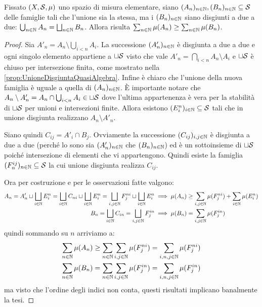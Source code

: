 \begin{lemma}\label{lemma:CoerenzaPremisura}
	Fissato $(X,\S,\mu)$ uno spazio di misura elementare, siano $(A_n)_{n\in\N},(B_n)_{n\in\N}\subseteq\S$ delle famiglie tali che l'unione sia la stessa, ma i $(B_n)_{n\in\N}$ siano disgiunti a due a due: $\bigcup_{n\in\N}A_n=\bigsqcup_{n\in\N}B_n$.
	Allora risulta $\sum_{n\in\N}\mu(A_n)\ge \sum_{n\in\N}\mu(B_n)$.
\end{lemma}
\begin{proof}
	Sia $A'_n=A_n\setminus\bigcup_{i<n}A_i$. La successione $(A'_n)_{n\in\N}$ è disgiunta a due a due e ogni singolo elemento appartiene a $\sqcup \S$ visto che vale $A'_n=\bigcap_{i<n}A_n\setminus A_i$ e $\sqcup \S$ è chiuso per intersezione finita, come mostrato nella \cref{prop:UnioneDisgiuntaQuasiAlgebra}. Infine è chiaro che l'unione della nuova famiglia è uguale a quella di $(A_n)_{n\in\N}$.
	È importante notare che $A_n\setminus A'_n=A_n\cap\bigcup_{i<n}A_i\in\sqcup\S$ dove l'ultima appartenenza è vera per la stabilità di $\sqcup\S$ per unioni e intersezioni finite. Allora esistono $(E^n_i)_{i\in\N}\subseteq\S$ tali che in unione disgiunta realizzano $A_n\setminus A'_n$.
	
	Siano quindi $C_{ij}=A'_i\cap B_j$. Ovviamente la successione $(C_{ij})_{i,j\in\N}$ è disgiunta a due a due (perché lo sono sia $(A'_n)_{n\in\N}$ che $(B_n)_{n\in\N}$) ed è un sottoinsieme di $\sqcup\S$ poiché intersezione di elementi che vi appartengono. Quindi esiste la famiglia $(F^{ij}_n)_{n\in\N}\subseteq\S$ la cui unione disgiunta realizza $C_{ij}$.
	
	Ora per costruzione e per le osservazioni fatte valgono:
	\begin{align*}
		A_n= A'_n\sqcup \bigsqcup_{i\in\N}E^n_i=\bigsqcup_{i\in\N}C_{ni}\sqcup \bigsqcup_{i\in\N}E^n_i
		=\bigsqcup_{i,j\in\N}F^{ni}_j\sqcup \bigsqcup_{i\in\N}E^n_i
		&\implies \mu(A_n)\ge\sum_{i,j\in\N}\mu(F^{ni}_j)+\sum_{i\in\N}\mu(E^n_i)\\
		B_n=\bigsqcup_{i\in\N}C_{in}=\bigsqcup_{i,j\in\N}F^{in}_j
		&\implies \mu(B_n)=\sum_{i,j\in\N}\mu(F^{in}_j)
	\end{align*}
	quindi sommando su $n$ arriviamo a:
	\begin{align*}
		\sum_{n\in\N}\mu(A_n)&\ge \sum_{n\in\N}\sum_{i,j\in\N}\mu(F^{ni}_j)
		=\sum_{i,n,j\in\N}\mu(F^{ni}_j)\\
		\sum_{n\in\N}\mu(B_n)&=\sum_{n\in\N}\sum_{i,j\in\N}\mu(F^{in}_j)=\sum_{i,n,j\in\N}\mu(F^{in}_j)
	\end{align*}
	ma visto che l'ordine degli indici non conta, questi risultati implicano banalmente la tesi.
\end{proof}



